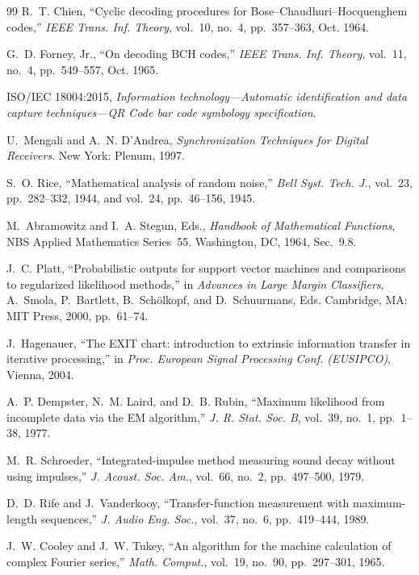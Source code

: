 \documentclass[11pt,a4paper]{article}
\theoremstyle{remark}
\begin{document}
\begin{thebibliography}{99}
R.~T. Chien, ``Cyclic decoding procedures for Bose--Chaudhuri--Hocquenghem codes,'' \emph{IEEE Trans. Inf. Theory}, vol.~10, no.~4, pp.~357--363, Oct. 1964.

G.~D. Forney, Jr., ``On decoding BCH codes,'' \emph{IEEE Trans. Inf. Theory}, vol.~11, no.~4, pp.~549--557, Oct. 1965.

ISO/IEC 18004:2015, \emph{Information technology---Automatic identification and data capture techniques---QR Code bar code symbology specification}.

U.~Mengali and A.~N. D'Andrea, \emph{Synchronization Techniques for Digital Receivers}. New York: Plenum, 1997.

S.~O. Rice, ``Mathematical analysis of random noise,'' \emph{Bell Syst. Tech. J.}, vol.~23, pp.~282--332, 1944, and vol.~24, pp.~46--156, 1945.

M.~Abramowitz and I.~A. Stegun, Eds., \emph{Handbook of Mathematical Functions}, NBS Applied Mathematics Series~55. Washington, DC, 1964, Sec.~9.8.

J.~C. Platt, ``Probabilistic outputs for support vector machines and comparisons to regularized likelihood methods,'' in \emph{Advances in Large Margin Classifiers}, A.~Smola, P.~Bartlett, B.~Sch\"olkopf, and D.~Schuurmans, Eds. Cambridge, MA: MIT Press, 2000, pp.~61--74.

J.~Hagenauer, ``The EXIT chart: introduction to extrinsic information transfer in iterative processing,'' in \emph{Proc. European Signal Processing Conf. (EUSIPCO)}, Vienna, 2004.

A.~P. Dempster, N.~M. Laird, and D.~B. Rubin, ``Maximum likelihood from incomplete data via the EM algorithm,'' \emph{J. R. Stat. Soc. B}, vol.~39, no.~1, pp.~1--38, 1977.

M.~R. Schroeder, ``Integrated-impulse method measuring sound decay without using impulses,'' \emph{J. Acoust. Soc. Am.}, vol.~66, no.~2, pp.~497--500, 1979.

D.~D. Rife and J.~Vanderkooy, ``Transfer-function measurement with maximum-length sequences,'' \emph{J. Audio Eng. Soc.}, vol.~37, no.~6, pp.~419--444, 1989.

J.~W. Cooley and J.~W. Tukey, ``An algorithm for the machine calculation of complex Fourier series,'' \emph{Math. Comput.}, vol.~19, no.~90, pp.~297--301, 1965.


\end{thebibliography}
\end{document}
